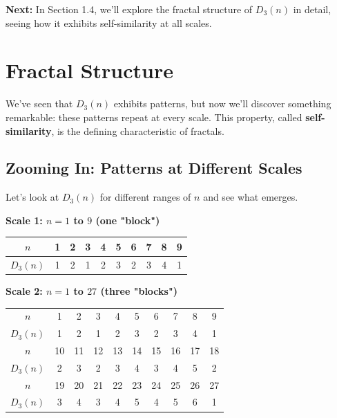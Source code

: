 \textbf{Next:} In Section 1.4, we'll explore the fractal structure of $D_3(n)$ in detail, seeing how it exhibits self-similarity at all scales.

\section{Fractal Structure}
\label{sec:fractal-structure}

We've seen that $D_3(n)$ exhibits patterns, but now we'll discover something remarkable: these patterns repeat at every scale. This property, called \textbf{self-similarity}, is the defining characteristic of fractals.

\subsection{Zooming In: Patterns at Different Scales}
\label{subsec:zooming-in}


Let's look at $D_3(n)$ for different ranges of $n$ and see what emerges.

\begin{center}
\textbf{Scale 1: $n = 1$ to $9$ (one "block")}
\begin{tabular}{c|c|c|c|c|c|c|c|c|c}
$n$ & 1 & 2 & 3 & 4 & 5 & 6 & 7 & 8 & 9 \\
\hline
$D_3(n)$ & 1 & 2 & 1 & 2 & 3 & 2 & 3 & 4 & 1 \\
\end{tabular}
\end{center}

\begin{center}
\textbf{Scale 2: $n = 1$ to $27$ (three "blocks")}
\begin{tabular}{c|ccc|ccc|ccc}
$n$ & 1 & 2 & 3 & 4 & 5 & 6 & 7 & 8 & 9 \\
$D_3(n)$ & 1 & 2 & 1 & 2 & 3 & 2 & 3 & 4 & 1 \\
\hline
$n$ & 10 & 11 & 12 & 13 & 14 & 15 & 16 & 17 & 18 \\
$D_3(n)$ & 2 & 3 & 2 & 3 & 4 & 3 & 4 & 5 & 2 \\
\hline
$n$ & 19 & 20 & 21 & 22 & 23 & 24 & 25 & 26 & 27 \\
$D_3(n)$ & 3 & 4 & 3 & 4 & 5 & 4 & 5 & 6 & 1 \\
\end{tabular}
\end{center}

